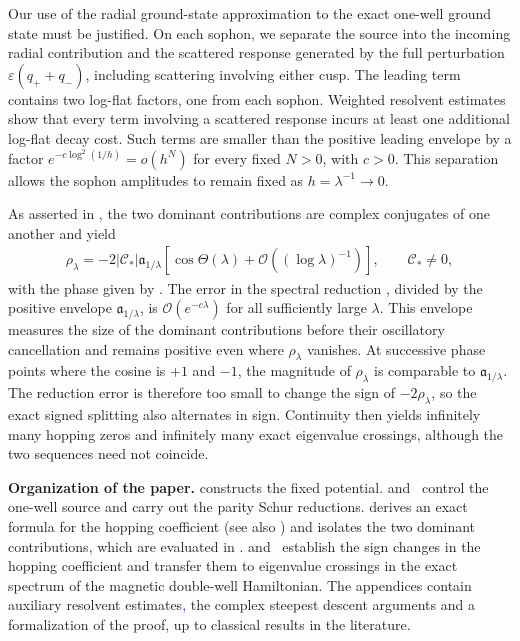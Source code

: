 \documentclass[11pt]{article}
\newcommand{\eps}{\varepsilon}
\newcommand{\cO}{\mathcal O}
\begin{document}
Our use of the radial ground-state approximation to the exact one-well
ground state must be justified. On each sophon, we separate the source
into the incoming radial contribution and the scattered response generated
by the full perturbation $\eps(q_++q_-)$, including scattering involving
either cusp. The leading term contains two log-flat factors, one from each
sophon. Weighted resolvent estimates show that every term involving a
scattered response incurs at least one additional log-flat decay cost.
Such terms are smaller than the positive leading envelope by a factor
$e^{-c\log^2(1/h)}=o(h^N)$ for every fixed $N>0$, with $c>0$.
This separation allows the sophon amplitudes to remain fixed as $h=\lambda^{-1}\to0$.

As asserted in , the two dominant contributions
are complex conjugates of one another and yield
\begin{align}\label{eq:cosine formula for rho}
 \rho_\lambda
 =-2|\mathscr C_*|\mathfrak a_{1/\lambda}
 \left[\cos\Theta(\lambda)
 +\cO\!\left((\log\lambda)^{-1}\right)\right],
 \qquad \mathscr C_*\ne0,
\end{align}
with the phase given by . The error in the spectral
reduction , divided by the positive envelope
$\mathfrak a_{1/\lambda}$, is $\mathcal O(e^{-c\lambda})$ for all
sufficiently large $\lambda$. This envelope measures the size of the
dominant contributions before their oscillatory cancellation and remains
positive even where $\rho_\lambda$ vanishes. At successive phase points
where the cosine is $+1$ and $-1$, the magnitude of $\rho_\lambda$ is
comparable to $\mathfrak a_{1/\lambda}$. The reduction error is therefore
too small to change the sign of $-2\rho_\lambda$, so the exact signed
splitting also alternates in sign. Continuity then yields infinitely many
hopping zeros and infinitely many exact eigenvalue crossings, although
the two sequences need not coincide.

\medskip\noindent\textbf{Organization of the paper.}
 constructs the fixed potential.
 and~ control the
one-well source and carry out the parity Schur reductions.
 derives an exact formula for the hopping
coefficient (see also \cite[(2.29)]{FSW-absence}) and isolates the two
dominant contributions, which are evaluated in
.
 and~
establish the sign changes in the hopping coefficient and transfer them
to eigenvalue crossings in the exact spectrum of the magnetic double-well
Hamiltonian. The appendices contain auxiliary resolvent estimates\textcolor{blue}{,} the
complex steepest descent arguments and a formalization of the proof, up to classical results in the literature.
\end{document}
